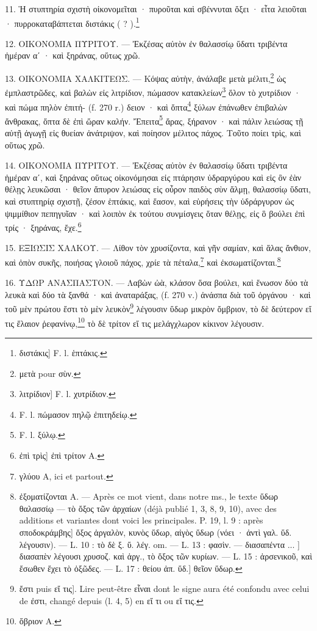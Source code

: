 \documentclass[a4paper, 11pt, oneside, polutonikogreek, french]{article}
\begin{document}
11. Ἡ στυπτηρία σχιστὴ οἰκονομεῖται · πυροῦται καὶ σβέννυται ὄξει · εἶτα λειοῦται · πυρροκαταβάπτεται διστάκις ( ? ).\footnote{διστάκις] F. l. ἑπτάκις.}

12. ΟΙΚΟΝΟΜΙΑ ΠΥΡΙΤΟΥ. --- Ἐκζέσας αὐτὸν ἐν θαλασσίῳ ὕδατι τριβέντα ἡμέραν αʹ · καὶ ξηράνας, οὕτως χρῶ.

13. ΟΙΚΟΝΟΜΙΑ ΧΑΛΚΙΤΕΩΣ. --- Κόψας αὐτὴν, ἀνάλαβε μετὰ μέλιτι,\footnote{μετὰ pour σὺν.} ὡς ἐμπλαστρῶδες, καὶ βαλὼν εἰς λιτρίδιον, πώμασον κατακλείων\footnote{λιτρίδιον] F. l. χυτρίδιον.} ὅλον τὸ χυτρίδιον · καὶ πώμα πηλὸν ἐπιτή- (f. 270 r.) δειον · καὶ ὄπτα\footnote{F. l. πώμασον πηλῷ ἐπιτηδείῳ.} ξύλων ἐπάνωθεν ἐπιβαλὼν ἄνθρακας, ὄπτα δὲ ἐπὶ ὥραν καλήν. Ἔπειτα\footnote{F. l. ξύλῳ.} ἄρας, ξήρανον · καὶ πάλιν λειώσας τῇ αὐτῇ ἀγωγῇ εἰς θυείαν ἀνάτριψον, καὶ ποίησον μέλιτος πάχος. Τοῦτο ποίει τρὶς, καὶ οὕτως χρῶ.

14. ΟΙΚΟΝΟΜΙΑ ΠΥΡΙΤΟΥ. --- Ἐκζέσας αὐτὸν ἐν θαλασσίῳ ὕδατι τριβέντα ἡμέραν αʹ, καὶ ξηράνας οὕτως οἰκονόμησαι εἰς πτάρησιν ὑδραργύρου καὶ εἰς ὂν ἐὰν θέλῃς λευκῶσαι · θεῖον ἄπυρον λειώσας εἰς οὖρον παιδὸς σὺν ἅλμῃ, θαλασσίῳ ὕδατι, καὶ στυπτηρίᾳ σχιστῇ, ζέσον ἑπτάκις, καὶ ἔασον, καὶ εὑρήσεις τὴν ὑδράργυρον ὡς ψιμμίθιον πεπηγυῖαν · καὶ λοιπὸν ἐκ τούτου συνμίσγεις ὅταν θέλῃς, εἰς ὃ βούλει ἐπὶ τρίς · ξηράνας, ἔχε.\footnote{ἐπὶ τρὶς] ἐπὶ τρίτον A.}

15. ΕΞΙΩΣΙΣ ΧΑΛΚΟΥ. --- Λίθον τὸν χρυσίζοντα, καὶ γῆν σαμίαν, καὶ ἅλας ἄνθιον, καὶ ὀπὸν συκῆς, ποιήσας γλοιοῦ πάχος, χρίε τὰ πέταλα,\footnote{γλύου A, ici et partout.} καὶ ἐκσωματίζονται.\footnote{ἐξοματίζονται A. --- Après ce mot vient, dans notre ms., le texte ὕδωρ θαλασσίῳ --- τὸ ὄξος τῶν ἀρχαίων (déjà publié 1, 3, 8, 9, 10), avec des additions et variantes dont voici les principales. P. 19, l. 9 : après σποδοκράμβης] ὄξος ἀργαλὸν, κυνὸς ὕδωρ, αἰγὸς ὕδωρ (νόει · ἀντὶ γαλ. ὕδ. λέγουσιν). --- L. 10 : τὸ δὲ ξ. ὕ. λέγ. om. --- L. 13 : φασὶν. --- διασαπέντα ... ] διασαπὲν λέγουσι χρυσοζ. καὶ ἀργ., τὸ ὄξος τῶν κυρίων. --- L. 15 : ἀρσενικοῦ, καὶ ἔσωθεν ἔχει τὸ ὀξῶδες. --- L. 17 : θείου ἀπ. ὕδ.] θεῖον ὕδωρ.}

16. ΥΔΩΡ ΑΝΑΣΠΑΣΤΟΝ. --- Λαβὼν ὠὰ, κλάσον ὅσα βούλει, καὶ ἕνωσον δύο τὰ λευκὰ καὶ δύο τὰ ξανθά · καὶ ἀναταράξας, (f. 270 v.) ἀνάσπα διὰ τοῦ ὀργάνου · καὶ τοῦ μὲν πρώτου ἔστι τὸ μὲν λευκὸν\footnote{ἔστι puis εἴ τις]. Lire peut-être εἶναι dont le signe aura été confondu avec celui de ἐστι, changé depuis (l. 4, 5) en εἴ τι ou εἴ τις.} λέγουσιν ὕδωρ μικρὸν ὄμβριον, τὸ δὲ δεύτερον εἴ τις ἔλαιον ῥεφανίνῳ,\footnote{ὅβριον A.} τὸ δὲ τρίτον εἴ τις μελάγχλωρον κίκινον λέγουσιν.
\end{document}
